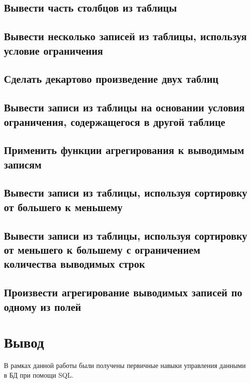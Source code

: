\section{Вывести часть столбцов из таблицы}



\section{Вывести несколько записей из таблицы, используя условие ограничения}



\section{Сделать декартово произведение двух таблиц}



\section{Вывести записи из таблицы на основании условия ограничения, содержащегося в другой таблице}



\section{Применить функции агрегирования к выводимым записям }



\section{Вывести записи из таблицы, используя сортировку от большего к меньшему}



\section{Вывести записи из таблицы, используя сортировку от меньшего к большему с ограничением количества выводимых строк}



\section{Произвести агрегирование выводимых записей по одному из полей }




\chapter{Вывод}

В рамках данной работы были получены первичные навыки управления данными в БД при помощи SQL.
